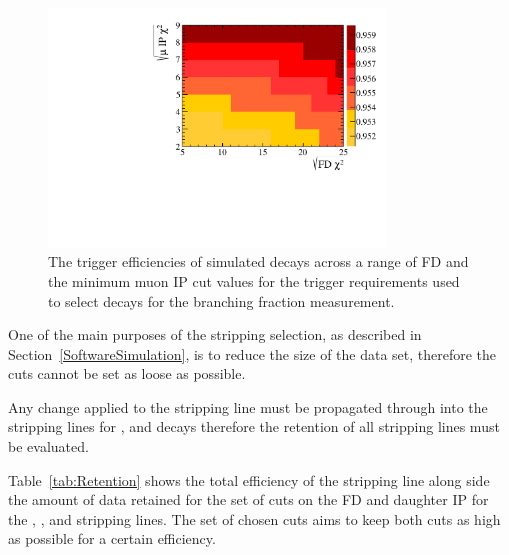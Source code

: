 \begin{figure}[htbp]
   \centering
        \includegraphics[width=0.8\textwidth]{./Figs/Selection/Dec_trigger_chart.pdf}
    \caption{The trigger efficiencies of \bsmumu simulated decays across a range of \bs FD \chisqd and the minimum muon IP \chisqd cut values for the trigger requirements used to select \bmumu decays for the branching fraction measurement. }
    \label{fig:triggereffplots}
\end{figure}





One of the main purposes of the stripping selection, as described in Section~\ref{SoftwareSimulation}, is to reduce the size of the data set, therefore the cuts cannot be set as loose as possible. 

Any change applied to the \bmumu stripping line must be propagated through into the stripping lines for \bhh, \bujpsik and \bsjpsiphi decays therefore the retention of all stripping lines must be evaluated.

Table~\ref{tab:Retention} shows the total efficiency of the \bsmumu stripping line along side the amount of data retained for the set of cuts on the FD \chisqd and daughter IP \chisqd for the \bmumu, \bhh, \bujpsik and \bsjpsiphi stripping lines. The set of chosen cuts aims to keep both cuts as high as possible for a certain \bsmumu efficiency. 



